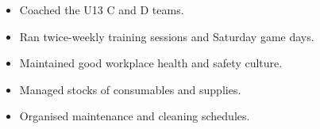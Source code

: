 

\begin{itemize}
    \item Coached the U13 C and D teams.
    \item Ran twice-weekly training sessions and Saturday game days.
\end{itemize}
\divider\smallskip

\begin{itemize}
    \item Maintained good workplace health and safety culture.
    \item Managed stocks of consumables and supplies.
    \item Organised maintenance and cleaning schedules.
\end{itemize}








